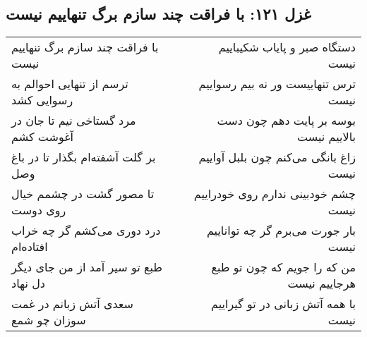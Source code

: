 \begin{center}
\section*{غزل ۱۲۱: با فراقت چند سازم برگ تنهاییم نیست}
\label{sec:121}
\begin{longtable}{l p{0.5cm} r}
با فراقت چند سازم برگ تنهاییم نیست
&&
دستگاه صبر و پایاب شکیباییم نیست
\\
ترسم از تنهایی احوالم به رسوایی کشد
&&
ترس تنهاییست ور نه بیم رسواییم نیست
\\
مرد گستاخی نیم تا جان در آغوشت کشم
&&
بوسه بر پایت دهم چون دست بالاییم نیست
\\
بر گلت آشفته‌ام بگذار تا در باغ وصل
&&
زاغ بانگی می‌کنم چون بلبل آواییم نیست
\\
تا مصور گشت در چشمم خیال روی دوست
&&
چشم خودبینی ندارم روی خودراییم نیست
\\
درد دوری می‌کشم گر چه خراب افتاده‌ام
&&
بار جورت می‌برم گر چه تواناییم نیست
\\
طبع تو سیر آمد از من جای دیگر دل نهاد
&&
من که را جویم که چون تو طبع هرجاییم نیست
\\
سعدی آتش زبانم در غمت سوزان چو شمع
&&
با همه آتش زبانی در تو گیراییم نیست
\\
\end{longtable}
\end{center}
